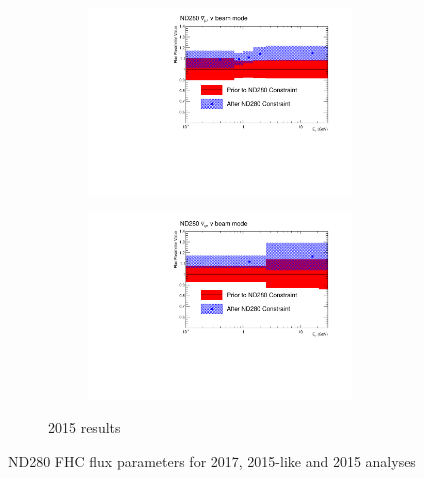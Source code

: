 \begin{figure}[h]
\begin{subfigure}[t]{\textwidth}
\begin{subfigure}[t]{0.24\textwidth}
	\includegraphics[width=\textwidth, trim={0mm 0mm 20mm 0mm}, clip]{figures/official/nd_pf_numub_flux_parms_bias_01}
\end{subfigure}
\begin{subfigure}[t]{0.24\textwidth}
	\includegraphics[width=\textwidth, trim={0mm 0mm 20mm 0mm}, clip]{figures/official/nd_pf_nueb_flux_parms_bias_01}
\end{subfigure}
\caption{2015 results}
\end{subfigure}

\caption{ND280 FHC flux parameters for 2017, 2015-like and 2015 analyses}
\label{fig:2015_fluxND280comp_fhc}
\end{figure}
	
